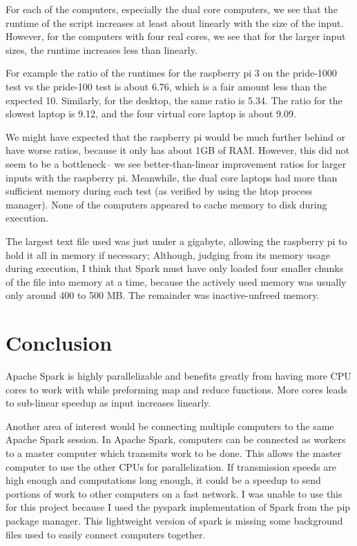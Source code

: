 \documentclass[12pt, letterpaper]{article}
\begin{document}
For each of the computers, especially the dual core computers, we see that the runtime of the script increases at least about linearly with the size of the input. However, for the computers with four real cores, we see that for the larger input sizes, the runtime increases less than linearly.

For example the ratio of the runtimes for the raspberry pi 3 on the pride-1000 test vs the pride-100 test is about 6.76, which is a fair amount less than the expected 10. Similarly, for the desktop, the same ratio is 5.34. The ratio for the slowest laptop is 9.12, and the four virtual core laptop is about 9.09.

We might have expected that the raspberry pi would be much further behind or have worse ratios, because it only has about 1GB of RAM. However, this did not seem to be a bottleneck-- we see better-than-linear improvement ratios for larger inputs with the raspberry pi. Meanwhile, the dual core laptops had more than sufficient memory during each test (as verified by using the htop process manager). None of the computers appeared to cache memory to disk during execution.

The largest text file used was just under a gigabyte, allowing the raspberry pi to hold it all in memory if necessary; Although, judging from its memory usage during execution, I think that Spark must have only loaded four smaller chunks of the file into memory at a time, because the actively used memory was usually only around 400 to 500 MB. The remainder was inactive-unfreed memory.


\section{Conclusion}
Apache Spark is highly parallelizable and benefits greatly from having more CPU cores to work with while preforming map and reduce functions. More cores leads to sub-linear speedup as input increases linearly.

Another area of interest would be connecting multiple computers to the same Apache Spark session. In Apache Spark, computers can be connected as workers to a master computer which transmits work to be done. This allows the master computer to use the other CPUs for parallelization. If transmission speeds are high enough and computations long enough, it could be a speedup to send portions of work to other computers on a fast network. I was unable to use this for this project because I used the pyspark implementation of Spark from the pip package manager. This lightweight version of spark is missing some background files used to easily connect computers together.





\clearpage
\end{document}
